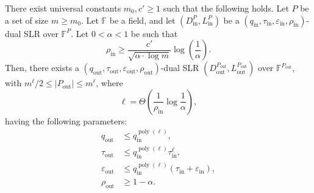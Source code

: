 \setcounter{nttheorem}{45}
\begin{nttheorem}
There exist universal constants $m_0,c'\geq1$ such that the following holds. Let $P$ be a set of size $m\geq m_0$. Let $\mathbb F$ be a field, and let $(D^P_{\mathrm{in}},L^P_{\mathrm{in}})$ be a $(q_{\mathrm{in}},\tau_{\mathrm{in}},\varepsilon_{\mathrm{in}},\rho_{\mathrm{in}})$-dual SLR over $\mathbb F^P$. Let $0<\alpha<1$ be such that
\begin{equation}\rho_{\mathrm{in}}\geq\frac{c'}{\sqrt{\alpha\cdot\log m}}\log\left(\frac1\alpha\right).\tag{4.11}\end{equation}
Then, there exists a $(q_{\mathrm{out}},\tau_{\mathrm{out}},\varepsilon_{\mathrm{out}},\rho_{\mathrm{out}})$-dual SLR $(D^{P_{\mathrm{out}}}_{\mathrm{out}},L^{P_{\mathrm{out}}}_{\mathrm{out}})$ over $\mathbb F^{P_{\mathrm{out}}}$, with $m^\ell/2\leq|P_{\mathrm{out}}|\leq m^\ell$, where
\begin{equation}\ell=\Theta\left(\frac1{\rho_{\mathrm{in}}}\log\frac1\alpha\right),\tag{4.12}\end{equation}
having the following parameters:
\begin{align*}q_{\mathrm{out}}&\leq q_{\mathrm{in}}^{\operatorname{poly}(\ell)},\\\tau_{\mathrm{out}}&\leq q_{\mathrm{in}}^{\operatorname{poly}(\ell)}\tau_{\mathrm{in}}^\ell,\\\varepsilon_{\mathrm{out}}&\leq q_{\mathrm{in}}^{\operatorname{poly}(\ell)}(\tau_{\mathrm{in}}+\varepsilon_{\mathrm{in}}),\\\rho_{\mathrm{out}}&\geq1-\alpha.\end{align*}
\end{nttheorem}
